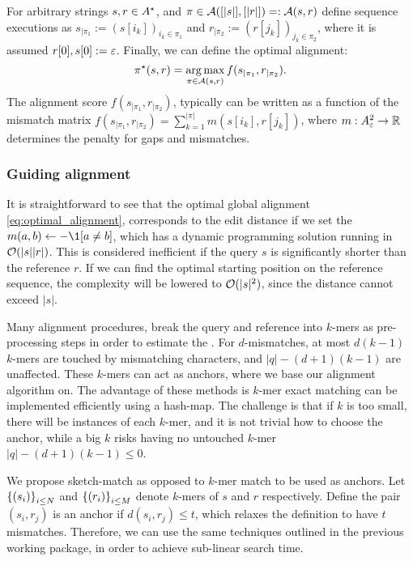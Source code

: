 For arbitrary strings $s,r\in A^\star$, and $\pi\in\mathcal{A}([|s|],[|r|])=:\mathcal{A}(s,r)$ define sequence executions as $s_{|\pi_1}:=(s[i_k])_{i_k\in \pi_1}$ and $r_{|\pi_2}:=(r[j_k])_{j_k\in \pi_2}$, where it is assumed $r[0],s[0]:=\varepsilon$. Finally, we can define the optimal alignment:
\begin{equation}
\label{eq:optimal_alignment}
    \pi^\star(s,r) = \operatorname*{arg\,max}_{\pi\in\mathcal{A}(s,r)} f(s_{|\pi_1},r_{|\pi_2}).
\end{equation}
The alignment score $f(s_{|\pi_1},r_{|\pi_2})$, typically can be written as a function of the mismatch matrix $f(s_{|\pi_1},r_{|\pi_2})=\sum_{k=1}^{|\pi|} m(s[i_k],r[j_k])$, where $m:A_\varepsilon^2\to\mathbb{R}$ determines the penalty for gaps and mismatches. 

\subsubsection*{Guiding alignment}
It is straightforward to see that the optimal global alignment \eqref{eq:optimal_alignment}, corresponds to the edit distance if we set the $m(a,b)\gets -\1[a\neq b]$, which has a dynamic programming solution running in $\mathcal{O}(|s||r|)$. This is considered inefficient if the query $s$ is significantly shorter than the reference $r$. If we can find the optimal starting position on the reference sequence, the complexity will be lowered to $\mathcal{O}(|s|^2)$, since the distance cannot exceed $|s|$. 

Many alignment procedures, break the query and reference into $k$-mers as pre-processing steps in order to estimate the . For $d$-mismatches, at most $d(k-1)$ $k$-mers are touched by mismatching characters, and $|q|-(d+1)(k-1)$ are unaffected. These $k$-mers can act as anchors, where we base our alignment algorithm on. The advantage of these methods is $k$-mer exact matching can be implemented efficiently using a hash-map. The challenge is that if $k$ is too small, there will be instances of each $k$-mer, and it is not trivial how to choose the anchor, while a big $k$ risks having no untouched $k$-mer $|q|-(d+1)(k-1)\le 0$.

We propose sketch-match as opposed to $k$-mer match to be used as anchors. Let $\left\{(s_i)\right\}_{i\le N}$ and $\left\{(r_i)\right\}_{i\le M}$ denote $k$-mers of $s$ and $r$ respectively. Define the pair $(s_i,r_j)$ is an anchor if  $d(s_i,r_j)\le t$, which relaxes the definition to have $t$ mismatches. Therefore, we can use the same techniques outlined in the previous working package, in order to achieve sub-linear search time. 


